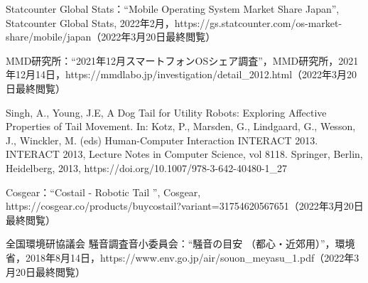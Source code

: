 \documentclass[a4paper]{jsarticle}
\begin{document}
\begin{thebibliography}{999}
Statcounter Global Stats：“Mobile Operating System Market Share Japan”, Statcounter Global Stats, 2022年2月，https://gs.statcounter.com/os-market-share/mobile/japan（2022年3月20日最終閲覧）

MMD研究所：“2021年12月スマートフォンOSシェア調査”，MMD研究所，2021年12月14日，https://mmdlabo.jp/investigation/detail\_2012.html（2022年3月20日最終閲覧）

Singh, A., Young, J.E, A Dog Tail for Utility Robots: Exploring Affective Properties of Tail Movement. In: Kotz, P., Marsden, G., Lindgaard, G., Wesson, J., Winckler, M. (eds) Human-Computer Interaction  INTERACT 2013. INTERACT 2013, Lecture Notes in Computer Science, vol 8118. Springer, Berlin, Heidelberg, 2013, https://doi.org/10.1007/978-3-642-40480-1\_27

\begin{flushleft}
Cosgear：“Costail - Robotic Tail ”, Cosgear, https://cosgear.co/products/buycostail?variant=31754620567651（2022年3月20日最終閲覧）
\end{flushleft}

全国環境研協議会 騒音調査音小委員会：“騒音の目安 （都心・近郊用）”，環境省，2018年8月14日，https://www.env.go.jp/air/souon\_meyasu\_1.pdf（2022年3月20日最終閲覧）


\end{thebibliography}
\end{document}
